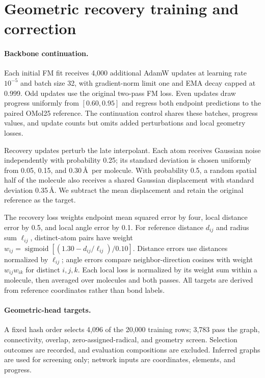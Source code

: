 \section{Geometric recovery training and correction}\label{app:geometric-recovery}
\paragraph{Backbone continuation.}
Each initial FM fit receives 4,000 additional AdamW updates at learning rate $10^{-5}$ and batch size 32, with gradient-norm limit one and EMA decay capped at 0.999. Odd updates use the original two-pass FM loss. Even updates draw progress uniformly from $[0.60,0.95]$ and regress both endpoint predictions to the paired OMol25 reference. The continuation control shares these batches, progress values, and update counts but omits added perturbations and local geometry losses.

Recovery updates perturb the late interpolant. Each atom receives Gaussian noise independently with probability 0.25; its standard deviation is chosen uniformly from 0.05, 0.15, and 0.30\,\AA\ per molecule. With probability 0.5, a random spatial half of the molecule also receives a shared Gaussian displacement with standard deviation 0.35\,\AA. We subtract the mean displacement and retain the original reference as the target.

The recovery loss weights endpoint mean squared error by four, local distance error by 0.5, and local angle error by 0.1. For reference distance $d_{ij}$ and radius sum $\ell_{ij}$, distinct-atom pairs have weight $w_{ij}=\operatorname{sigmoid}[(1.30-d_{ij}/\ell_{ij})/0.10]$. Distance errors use distances normalized by $\ell_{ij}$; angle errors compare neighbor-direction cosines with weight $w_{ij}w_{ik}$ for distinct $i,j,k$. Each local loss is normalized by its weight sum within a molecule, then averaged over molecules and both passes. All targets are derived from reference coordinates rather than bond labels.

\paragraph{Geometric-head targets.}
A fixed hash order selects 4,096 of the 20,000 training rows; 3,783 pass the graph, connectivity, overlap, zero-assigned-radical, and geometry screen. Selection outcomes are recorded, and evaluation compositions are excluded. Inferred graphs are used for screening only; network inputs are coordinates, elements, and progress.

